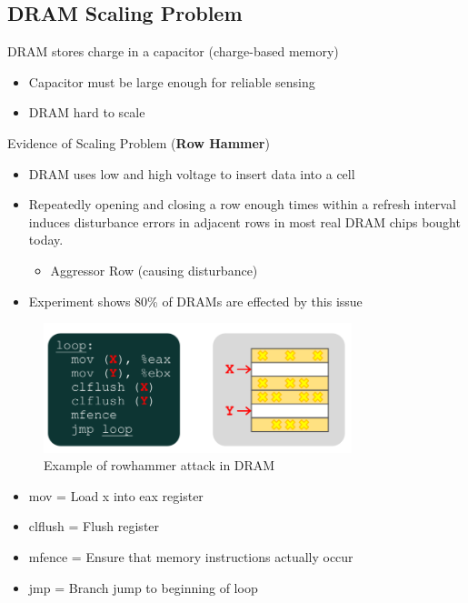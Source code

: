 \documentclass[]{article}
\providecommand{\tightlist}{%
  \setlength{\itemsep}{0pt}\setlength{\parskip}{0pt}}
\begin{document}
\hypertarget{dram-scaling-problem}{%
\subsection{DRAM Scaling Problem}\label{dram-scaling-problem}}

DRAM stores charge in a capacitor (charge-based memory)

\begin{itemize}
\tightlist
\item
  Capacitor must be large enough for reliable sensing
\item
  DRAM hard to scale
\end{itemize}

Evidence of Scaling Problem (\textbf{Row Hammer})

\begin{itemize}
\tightlist
\item
  DRAM uses low and high voltage to insert data into a cell
\item
  Repeatedly opening and closing a row enough times within a refresh
  interval induces disturbance errors in adjacent rows in most real DRAM
  chips bought today.

  \begin{itemize}
  \tightlist
  \item
    Aggressor Row (causing disturbance)
  \end{itemize}
\item
  Experiment shows 80\% of DRAMs are effected by this issue
\end{itemize}

\begin{figure}
\centering
\includegraphics[width=0.8\textwidth,height=\textheight]{./tex2pdf.-ee748c56ff17e1e1/8b1c1a0d77db887c14f21bd20d64b4f7d321df1c.png}
\caption{Example of rowhammer attack in DRAM}
\end{figure}

\begin{itemize}
\tightlist
\item
  mov = Load x into eax register
\item
  clflush = Flush register
\item
  mfence = Ensure that memory instructions actually occur
\item
  jmp = Branch jump to beginning of loop
\end{itemize}
\end{document}
